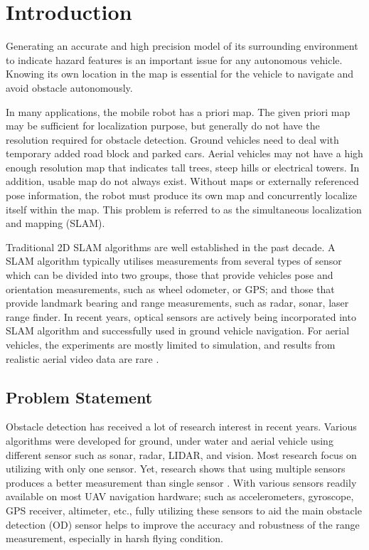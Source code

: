 \chapter{Introduction} \label{ch:intro}

Generating an accurate and high precision model of its surrounding 
environment to indicate hazard features is an important issue for any 
autonomous vehicle. Knowing its own location in the map is essential for 
the vehicle to navigate and avoid obstacle autonomously. 

In many applications, the mobile robot has a priori map. The given 
priori map may be sufficient for localization purpose, but generally do 
not have the resolution required for obstacle detection. Ground vehicles 
need to deal with temporary added road block and parked cars. Aerial 
vehicles may not have a high enough resolution map that indicates tall 
trees, steep hills or electrical towers. In addition, usable map do not 
always exist. Without maps or externally referenced pose information, 
the robot must produce its own map and concurrently localize itself 
within the map. This problem is referred to as the simultaneous 
localization and mapping (SLAM). 

Traditional 2D SLAM algorithms are well established in the past
decade. A SLAM algorithm typically utilises measurements from several
types of sensor which can be divided into two groups, those that
provide vehicles pose and orientation measurements, such as wheel
odometer, or GPS; and those that provide landmark bearing and range
measurements, such as radar, sonar, laser range finder. In recent
years, optical sensors are actively being incorporated into SLAM
algorithm and successfully used in ground vehicle navigation. For
aerial vehicles, the experiments are mostly limited to simulation, and
results from realistic aerial video data are rare \cite{nemra_robust_2010}
\cite{jianli_unscented_2011} \cite{sunderhauf_using_2007} \cite{artieda_visual_2009}.

\section{Problem Statement}\label{section:ProblemStatement}
Obstacle detection has received a lot of research interest in recent
years. Various algorithms were developed for ground, under water and
aerial vehicle using different sensor such as sonar, radar, LIDAR, and
vision. Most research focus on utilizing with only one sensor. Yet,
research shows that using multiple sensors produces a better
measurement than single sensor \cite{smith_approaches_2006}. With
various sensors readily available on most UAV navigation hardware;
such as accelerometers, gyroscope, GPS receiver, altimeter, etc.,
fully utilizing these sensors to aid the main obstacle detection (OD)
sensor helps to improve the accuracy and robustness of the range
measurement, especially in harsh flying condition.

